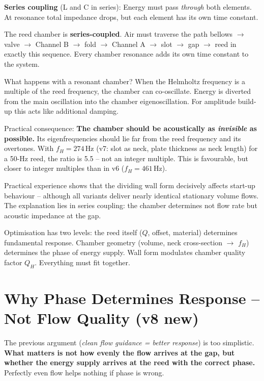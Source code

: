 \documentclass[11pt,a4paper]{article}
\begin{document}
\textbf{Series coupling} (L and C in series): Energy must pass \textit{through} both elements. At resonance total impedance drops, but each element has its own time constant.

\begin{keybox}
The reed chamber is \textbf{series-coupled}. Air must traverse the path bellows $\rightarrow$ valve $\rightarrow$ Channel B $\rightarrow$ fold $\rightarrow$ Channel A $\rightarrow$ slot $\rightarrow$ gap $\rightarrow$ reed in exactly this sequence. Every chamber resonance adds its own time constant to the system.
\end{keybox}

What happens with a resonant chamber? When the Helmholtz frequency is a multiple of the reed frequency, the chamber can co-oscillate. Energy is diverted from the main oscillation into the chamber eigenoscillation. For amplitude build-up this acts like additional damping.

Practical consequence: \textbf{The chamber should be acoustically as \emph{invisible} as possible.} Its eigenfrequencies should lie far from the reed frequency and its overtones. With $f_H = 274$\,Hz (v7: slot as neck, plate thickness as neck length) for a 50-Hz reed, the ratio is 5.5 -- not an integer multiple. This is favourable, but closer to integer multiples than in v6 ($f_H = 461$\,Hz).

Practical experience shows that the dividing wall form decisively affects start-up behaviour -- although all variants deliver nearly identical stationary volume flows. The explanation lies in series coupling: the chamber determines not flow rate but acoustic impedance at the gap.

\begin{keybox}
Optimisation has two levels: the reed itself ($Q$, offset, material) determines fundamental response. Chamber geometry (volume, neck cross-section $\to$ $f_H$) determines the phase of energy supply. Wall form modulates chamber quality factor $Q_H$. Everything must fit together.
\end{keybox}

\section{Why Phase Determines Response -- Not Flow Quality (v8 new)}

The previous argument (\emph{clean flow guidance = better response}) is too simplistic. \textbf{What matters is not how evenly the flow arrives at the gap, but whether the energy supply arrives at the reed with the correct phase.} Perfectly even flow helps nothing if phase is wrong.
\end{document}
